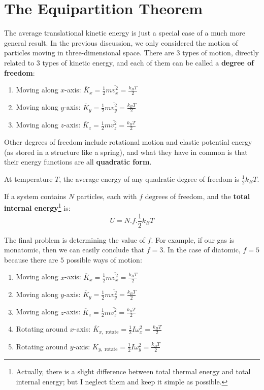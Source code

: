 \documentclass[~/PhyAI/phyai.tex]{subfiles}
\begin{document}
\section{The Equipartition Theorem}\label{sec:the_equipartition_theorem} %
The average translational kinetic energy is just a special case of a much more general result. In the previous discussion, we only considered the motion of particles moving in three-dimensional space. There are $3$ types of motion, directly related to $3$ types of kinetic energy, and each of them can be called a \textbf{degree of freedom}:
\begin{enumerate}
	\item Moving along $x$-axis: $ \overline{K}_{x}=\displaystyle\frac{1 }{2}m\overline{v_{x}^{2}}=\frac{k_{B}T }{2}$
	\item Moving along $y$-axis: $ \overline{K}_{y}=\displaystyle\frac{1 }{2}m\overline{v_{y}^{2}}=\frac{k_{B}T }{2}$
	\item Moving along $z$-axis: $ \overline{K}_{z}=\displaystyle\frac{1 }{2}m\overline{v_{z}^{2}}=\frac{k_{B}T }{2}$
\end{enumerate}
Other degrees of freedom include rotational motion and elastic potential energy (as stored in a structure like a spring), and what they have in common is that their energy functions are all \textbf{quadratic form}.
\begin{theorem}
	\label{The Equipartition Theorem}
	At temperature $T$, the average energy of any quadratic degree of freedom is $ \displaystyle\frac{1 }{2}k_{B}T $.
\end{theorem}
\begin{corollary}
	\label{Total Internal Energy}
	If a system contains $N$ particles, each with $f$ degrees of freedom, and the \textbf{total internal energy}\footnote[1]{Actually, there is a slight difference between total thermal energy and total internal energy; but I neglect them and keep it simple as possible.} is: $$ U=N.f. \frac{1 }{2}k_{B}T $$
\end{corollary}
The final problem is determining the value of $f$. For example, if our gas is monatomic, then we can easily conclude that  $f=3$. In the case of diatomic, $f=5$ because there are $5$ possible ways of motion:
\begin{enumerate}
	\item Moving along $x$-axis: $ \overline{K}_{x}=\displaystyle\frac{1 }{2}m\overline{v_{x}^{2}}=\frac{k_{B}T }{2}$
	\item Moving along $y$-axis: $ \overline{K}_{y}=\displaystyle\frac{1 }{2}m\overline{v_{y}^{2}}=\frac{k_{B}T }{2}$
	\item Moving along $z$-axis: $ \overline{K}_{z}=\displaystyle\frac{1 }{2}m\overline{v_{z}^{2}}=\frac{k_{B}T }{2}$
	\item Rotating around $x$-axis: $\overline{K}_{x,\text{ rotate}}=\displaystyle\frac{1}{2}I\omega_{x}^{2}=\frac{k_{B}T}{2}$
	\item Rotating around $y$-axis: $\overline{K}_{y,\text{ rotate}}=\displaystyle\frac{1}{2}I\omega_{y}^{2}=\frac{k_{B}T}{2}$
\end{enumerate}
\end{document}
